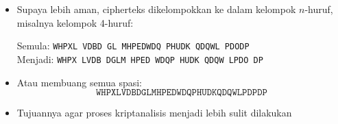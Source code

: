 \documentclass{article}
\begin{document}

\begin{itemize}
    \item Supaya lebih aman, cipherteks dikelompokkan ke dalam kelompok $n$-huruf, misalnya kelompok 4-huruf:
    
    \noindent Semula: \texttt{WHPXL VDBD GL MHPEDWDQ PHUDK QDQWL PDODP}\\
    Menjadi: \texttt{WHPX LVDB DGLM HPED WDQP HUDK QDQW LPDO DP}
    
    \item Atau membuang semua spasi:
    \[ \texttt{WHPXLVDBDGLMHPEDWDQPHUDKQDQWLPDPDP} \]
    
    \item Tujuannya agar proses kriptanalisis menjadi lebih sulit dilakukan
\end{itemize}
\end{document}
